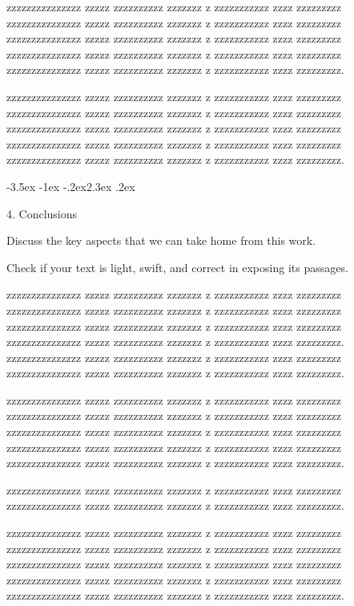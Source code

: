 \documentclass[prl,twocolumn]{revtex4-1}
\makeatletter
\renewcommand{\section}{\@startsection{section}{1}{\z@}%
	{-3.5ex \@plus -1ex \@minus -.2ex}{2.3ex \@plus.2ex}%
	{\normalfont\bfseries\raggedright}}
\makeatother
\begin{document}
  zzzzzzzzzzzzzzz zzzzz zzzzzzzzzz zzzzzzz z zzzzzzzzzzz zzzz zzzzzzzzz
  zzzzzzzzzzzzzzz zzzzz zzzzzzzzzz zzzzzzz z zzzzzzzzzzz zzzz zzzzzzzzz
  zzzzzzzzzzzzzzz zzzzz zzzzzzzzzz zzzzzzz z zzzzzzzzzzz zzzz zzzzzzzzz
  zzzzzzzzzzzzzzz zzzzz zzzzzzzzzz zzzzzzz z zzzzzzzzzzz zzzz zzzzzzzzz
  zzzzzzzzzzzzzzz zzzzz zzzzzzzzzz zzzzzzz z zzzzzzzzzzz zzzz zzzzzzzzz.

  


  zzzzzzzzzzzzzzz zzzzz zzzzzzzzzz zzzzzzz z zzzzzzzzzzz zzzz zzzzzzzzz
  zzzzzzzzzzzzzzz zzzzz zzzzzzzzzz zzzzzzz z zzzzzzzzzzz zzzz zzzzzzzzz
  zzzzzzzzzzzzzzz zzzzz zzzzzzzzzz zzzzzzz z zzzzzzzzzzz zzzz zzzzzzzzz
  zzzzzzzzzzzzzzz zzzzz zzzzzzzzzz zzzzzzz z zzzzzzzzzzz zzzz zzzzzzzzz
  zzzzzzzzzzzzzzz zzzzz zzzzzzzzzz zzzzzzz z zzzzzzzzzzz zzzz zzzzzzzzz.

\section{4. Conclusions}

Discuss the key aspects that we can take home from this work.

Check if your text is light, swift, and correct in exposing its passages.

  zzzzzzzzzzzzzzz zzzzz zzzzzzzzzz zzzzzzz z zzzzzzzzzzz zzzz zzzzzzzzz
  zzzzzzzzzzzzzzz zzzzz zzzzzzzzzz zzzzzzz z zzzzzzzzzzz zzzz zzzzzzzzz
  zzzzzzzzzzzzzzz zzzzz zzzzzzzzzz zzzzzzz z zzzzzzzzzzz zzzz zzzzzzzzz
  zzzzzzzzzzzzzzz zzzzz zzzzzzzzzz zzzzzzz z zzzzzzzzzzz zzzz zzzzzzzzz.
  zzzzzzzzzzzzzzz zzzzz zzzzzzzzzz zzzzzzz z zzzzzzzzzzz zzzz zzzzzzzzz
  zzzzzzzzzzzzzzz zzzzz zzzzzzzzzz zzzzzzz z zzzzzzzzzzz zzzz zzzzzzzzz.

  
  zzzzzzzzzzzzzzz zzzzz zzzzzzzzzz zzzzzzz z zzzzzzzzzzz zzzz zzzzzzzzz
  zzzzzzzzzzzzzzz zzzzz zzzzzzzzzz zzzzzzz z zzzzzzzzzzz zzzz zzzzzzzzz
  zzzzzzzzzzzzzzz zzzzz zzzzzzzzzz zzzzzzz z zzzzzzzzzzz zzzz zzzzzzzzz
  zzzzzzzzzzzzzzz zzzzz zzzzzzzzzz zzzzzzz z zzzzzzzzzzz zzzz zzzzzzzzz
  zzzzzzzzzzzzzzz zzzzz zzzzzzzzzz zzzzzzz z zzzzzzzzzzz zzzz zzzzzzzzz.
  
  zzzzzzzzzzzzzzz zzzzz zzzzzzzzzz zzzzzzz z zzzzzzzzzzz zzzz zzzzzzzzz
  zzzzzzzzzzzzzzz zzzzz zzzzzzzzzz zzzzzzz z zzzzzzzzzzz zzzz zzzzzzzzz.

  
  
  zzzzzzzzzzzzzzz zzzzz zzzzzzzzzz zzzzzzz z zzzzzzzzzzz zzzz zzzzzzzzz
  zzzzzzzzzzzzzzz zzzzz zzzzzzzzzz zzzzzzz z zzzzzzzzzzz zzzz zzzzzzzzz
  zzzzzzzzzzzzzzz zzzzz zzzzzzzzzz zzzzzzz z zzzzzzzzzzz zzzz zzzzzzzzz
  zzzzzzzzzzzzzzz zzzzz zzzzzzzzzz zzzzzzz z zzzzzzzzzzz zzzz zzzzzzzzz
  zzzzzzzzzzzzzzz zzzzz zzzzzzzzzz zzzzzzz z zzzzzzzzzzz zzzz zzzzzzzzz.
  
\end{document}

